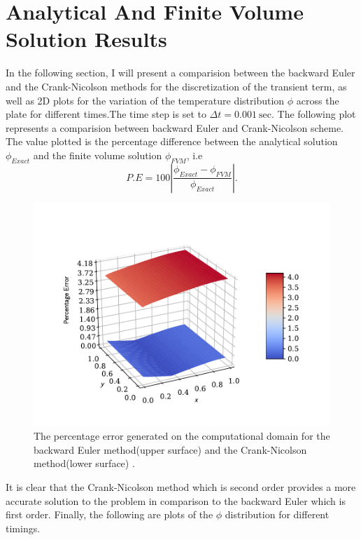 \documentclass[a4paper, 11pt]{article}
\begin{document}
\section*{Analytical And Finite Volume Solution Results}
In the following section, I will present a comparision between the backward Euler and the Crank-Nicolson methods for the discretization of the transient term, as well as 2D plots for the variation of the temperature distribution $\phi$ across the plate for different times.The time step is set to $\Delta t=0.001 \ \text{sec}.$
The following plot represents a comparision between backward Euler and Crank-Nicolson scheme. The value plotted is the percentage difference between the analytical solution $\phi_{Exact}$ and the finite volume solution $\phi_{FVM}$, i.e 
\begin{equation*} 
P.E =  100|\frac{\phi_{Exact}-\phi_{FVM}}{\phi_{Exact}}|.
\end{equation*}
\begin{figure}[ht!]
  \centering
  \includegraphics[width=1\linewidth]{0d5sec.pdf}
  \caption{The percentage error generated on the computational domain for the backward Euler method(upper surface) and the Crank-Nicolson method(lower surface) .}
  \label{fig:sub31}
\label{fig:sub32}
\end{figure}
It is clear that the Crank-Nicolson method which is second order provides a more accurate solution to the problem in comparison to the backward Euler which is first order. Finally, the following are plots of the $\phi$ distribution for different timings.
\end{document}
